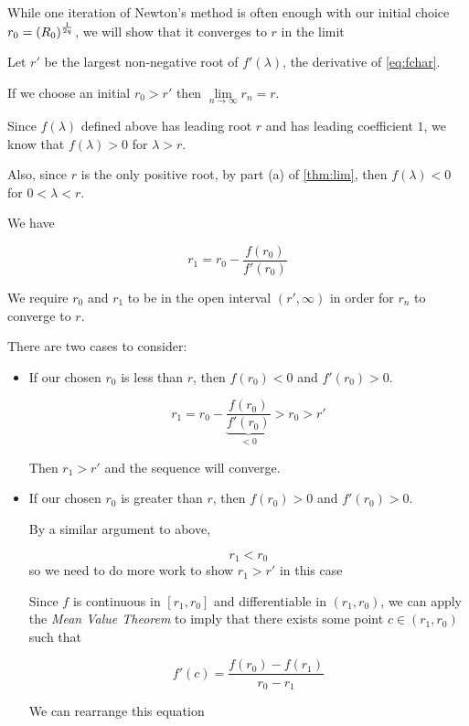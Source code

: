 While one iteration of Newton's method is often enough with our initial choice $r_0=\left(R_0\right)^{\frac1{2q}}$, we will show that it converges to $r$ in the limit

\begin{lemma}
Let $r'$ be the largest non-negative root of $f'(\lambda)$, the derivative of \eqref{eq:fchar}. 

If we choose an initial $r_0 > r'$ then $\lim\limits_{n\to\infty} r_n = r$.

\begin{pf}
Since $f(\lambda)$ defined above has leading root $r$ and has leading coefficient $1$, we know that $f(\lambda)>0$ for $\lambda>r$.

Also, since $r$ is the only positive root, by part (a) of \ref{thm:lim}, then $f(\lambda)<0$ for $0<\lambda<r$.

We have 

\begin{equation}\label{eq:r1newton}
r_1 = r_0 - \frac{f(r_0)}{f'(r_0)}
\end{equation}

We require $r_0$ and $r_1$ to be in the open interval $(r',\infty)$ in order for $r_n$ to converge to $r$.

There are two cases to consider:

\begin{itemize}
\item  If our chosen $r_0$ is less than $r$, then $f(r_0)<0$ and $f'(r_0)>0$.

$$r_1 = r_0 - \underbrace{\frac{f(r_0)}{f'(r_0)}}_{<0} > r_0 > r'$$


Then $r_1>r'$ and the sequence will converge.

\item   If our chosen $r_0$ is greater than $r$, then $f(r_0)>0$ and $f'(r_0)>0$.

By a similar argument to above, 

$$r_1 < r_0$$ so we need to do more work to show $r_1 > r'$ in this case

Since $f$ is continuous in $[r_1,r_0]$ and differentiable in $(r_1,r_0)$, we can apply the \textit{Mean Value Theorem} to imply that there exists some point $c\in (r_1,r_0)$ such that 

\begin{equation}
f'(c)=\frac{f(r_0)-f(r_1)}{r_0-r_1}
\end{equation}

We can rearrange this equation


\end{itemize}
\end{pf}
\end{lemma}
